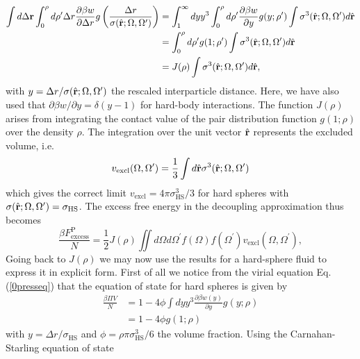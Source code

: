 \documentclass[amssymb]{revtex4}
\newcommand{\bfr}{{\bf r}}
\begin{document}
\begin{align}
\int d\Delta \bfr \int_{0}^{\rho} d\rho^{\prime} \Delta r \frac{\partial \beta w}{\partial \Delta r}
g\left(\frac{\Delta r}{\sigma(\hat{\bfr};\Omega,\Omega^{\prime})}\right) 
&= \int_{1}^{\infty} dy y^{3} \int_{0}^{\rho} d\rho^{\prime} \frac{\partial \beta w}{\partial y} g(y;\rho^{\prime})
\int  \sigma^{3}(\hat{\bfr};\Omega,\Omega^{\prime})d\hat{\bfr} \nonumber \\
&=\int_{0}^{\rho} d\rho^{\prime}  g(1;\rho^{\prime})\int  \sigma^{3}(\hat{\bfr};\Omega,\Omega^{\prime})d\hat{\bfr} \nonumber \\
&= J(\rho)\int \sigma^{3}(\hat{\bfr};\Omega,\Omega^{\prime})d\hat{\bfr},
\end{align}
with $y=\Delta r/ \sigma(\hat{\bfr};\Omega,\Omega^{\prime})$ the 
rescaled interparticle distance. Here, we have also used that $\partial \beta w/\partial y=\delta(y-1)$
for hard-body interactions. 
The function $J(\rho)$  arises from integrating the contact value of the pair distribution function
$g(1;\rho)$ over 
the density $\rho$.
The integration over the unit vector $\hat{\bfr}$ represents the 
excluded volume, i.e. 
\begin{equation}
v_{\text{excl}}(\Omega,\Omega^{\prime})= \frac{1}{3}\int d\hat{\bfr} \sigma^{3}(\hat{\bfr};\Omega,\Omega^{\prime})
\end{equation}
which gives the correct limit $v_{\text{excl}}=4\pi\sigma^{3}_{\text{HS}}/3$ for hard spheres
with $\sigma(\hat{\bfr};\Omega,\Omega^{\prime}) =\sigma_{\text{HS}}$.
The excess free energy in the decoupling approximation thus becomes
\begin{equation}
\frac{\beta F^{\text{P}}_{\text{excess}}}{N}=\frac{1}{2}J(\rho)\iint d\Omega d\Omega^{\prime}
f(\Omega)f(\Omega^{\prime})v_{\text{excl}}(\Omega,\Omega^{\prime}),
\label{0freeparsons}
\end{equation}
Going back to $J(\rho)$ we may now use the results for a hard-sphere fluid to express
it in  explicit form. First of all we notice from the virial equation Eq. (\ref{0presseq}) that
the equation of state for hard spheres is given by
\begin{align}
\frac{\beta \Pi V}{N} &= 1-4 \phi \int dyy^{3}\frac{\partial 
\beta w(y)}{\partial y} g(y;\rho) \nonumber \\
&= 1-4\phi g(1;\rho)
\end{align}
with $y=\Delta r/\sigma_{\text{HS}}$ and $\phi=\rho \pi \sigma_{\text{HS}}^{3}/6$ the volume fraction.  
Using the Carnahan-Starling equation of state \cite{carnahanstarling}
\end{document}
